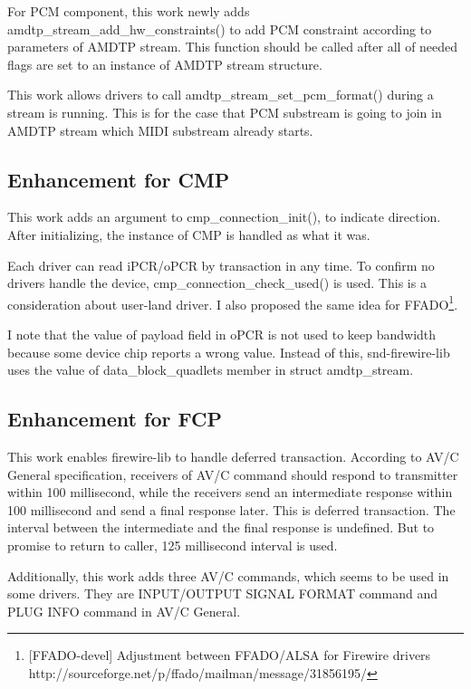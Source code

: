 \documentclass[onecolumn]{article}
\begin{document}
For PCM component, this work newly adds amdtp\_stream\_add\_hw\_constraints() to add PCM constraint according to parameters of AMDTP stream. This function should be called after all of needed flags are set to an instance of AMDTP stream structure.

This work allows drivers to call amdtp\_stream\_set\_pcm\_format() during a stream is running. This is for the case that PCM substream is going to join in AMDTP stream which MIDI substream already starts.

\subsection{Enhancement for CMP}

This work adds an argument to cmp\_connection\_init(), to indicate direction. After initializing, the instance of CMP is handled as what it was.

Each driver can read iPCR/oPCR by transaction in any time. To confirm no drivers handle the device, cmp\_connection\_check\_used() is used. This is a consideration about user-land driver. I also proposed the same idea for FFADO\footnote{[FFADO-devel] Adjustment between FFADO/ALSA for Firewire drivers  http://sourceforge.net/p/ffado/mailman/message/31856195/}.

I note that the value of payload field in oPCR is not used to keep bandwidth because some device chip reports a wrong value. Instead of this, snd-firewire-lib uses the value of data\_block\_quadlets member in struct amdtp\_stream.

\subsection{Enhancement for FCP}

This work enables firewire-lib to handle deferred transaction. According to AV/C General specification\cite{avc-general-4-2}, receivers of AV/C command should respond to transmitter within 100 millisecond, while the receivers send an intermediate response within 100 millisecond and send a final response later. This is deferred transaction. The interval between the intermediate and the final response is undefined. But to promise to return to caller, 125 millisecond interval is used.

Additionally, this work adds three AV/C commands, which seems to be used in some drivers. They are INPUT/OUTPUT SIGNAL FORMAT command and PLUG INFO command in AV/C General\cite{avc-general-4-2}.
\end{document}
